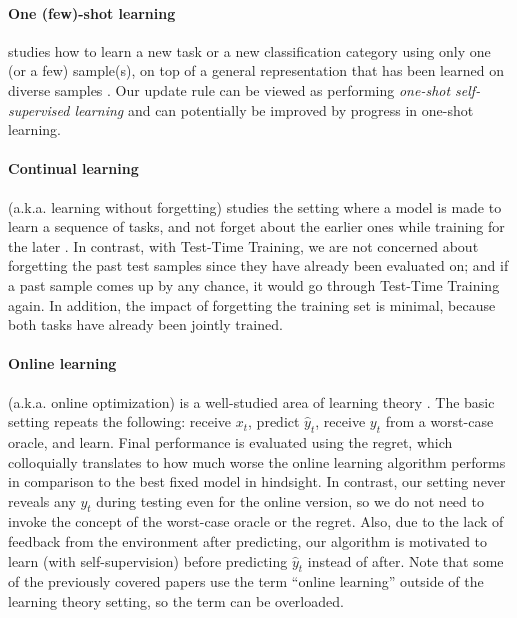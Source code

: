 \paragraph{One (few)-shot learning} studies how to learn a new task or a new classification category using only one (or a few) sample(s), on top of a general representation that has been learned on diverse samples 
\citep{snell2017prototypical, vinyals2016matching, fei2006one, ravi2016optimization, li2017meta, finn2017model, gidaris2018dynamic}.
Our update rule can be viewed as performing \emph{one-shot self-supervised learning} and can potentially be improved by progress in one-shot learning.

\paragraph{Continual learning} (a.k.a. learning without forgetting) studies the setting where a model is made to learn a sequence of tasks, and not forget about the earlier ones while training for the later \citep{li2017learning, lopez2017gradient, kirkpatrick2017overcoming, santoro2016meta}. In contrast, with Test-Time Training, we are not concerned about forgetting the past test samples since they have already been evaluated on; and if a past sample comes up by any chance, it would go through Test-Time Training again. In addition, the impact of forgetting the training set is minimal, because both tasks have already been jointly trained.

\paragraph{Online learning} (a.k.a. online optimization) is a well-studied area of learning theory
\citep{shalev2012online, hazan2016introduction}. 
The basic setting repeats the following: receive $x_t$, predict $\hat{y}_t$, receive $y_t$ from a worst-case oracle, and learn.
Final performance is evaluated using the regret, which colloquially translates to how much worse the online learning algorithm performs in comparison to the best fixed model in hindsight.
In contrast, our setting never reveals any $y_t$ during testing even for the online version, so we do not need to invoke the concept of the worst-case oracle or the regret.
Also, due to the lack of feedback from the environment after predicting, our algorithm is motivated to learn (with self-supervision) before predicting $\hat{y}_t$ instead of after.
Note that some of the previously covered papers \cite{hoffman2014continuous, jain2011online, mullapudi2018online} use the term ``online learning'' outside of the learning theory setting, so the term can be overloaded.
